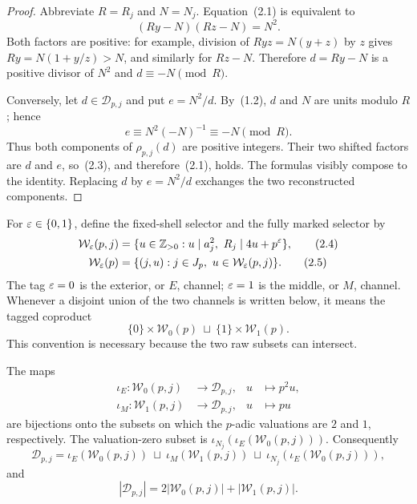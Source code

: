 \begin{proof}
Abbreviate \(R=R_j\) and \(N=N_j\).  Equation~(2.1) is equivalent to
\begin{equation}
 (Ry-N)(Rz-N)=N^2.                                            \tag{2.3}
\end{equation}
Both factors are positive: for example, division of
\(Ryz=N(y+z)\) by \(z\) gives \(Ry=N(1+y/z)>N\), and similarly for
\(Rz-N\).  Therefore \(d=Ry-N\) is a positive divisor of \(N^2\) and
\(d\equiv-N\pmod R\).

Conversely, let \(d\in\mathscr D_{p,j}\) and put \(e=N^2/d\).  By~(1.2),
\(d\) and \(N\) are units modulo \(R\); hence
\[
 e\equiv N^2(-N)^{-1}\equiv-N\pmod R.
\]
Thus both components of \(\rho_{p,j}(d)\) are positive integers.  Their
 two shifted factors are \(d\) and \(e\), so~(2.3), and therefore~(2.1),
 holds.  The formulas visibly compose to the identity.  Replacing \(d\) by
\(e=N^2/d\) exchanges the two reconstructed components.
\end{proof}

For \(\varepsilon\in\{0,1\}\), define the fixed-shell selector and the fully marked
selector by
\begin{align}
 \mathcal W_\eps(p,j)
 &=\{u\in\ZZpos:u\mid a_j^2,\ R_j\mid4u+p^\eps\},             \tag{2.4}\\
 \mathcal W_\eps(p)
 &=\{(j,u):j\in J_p,\ u\in\mathcal W_\eps(p,j)\}.           \tag{2.5}
\end{align}
The tag \(\varepsilon=0\) is the exterior, or \(E\), channel; \(\varepsilon=1\) is the
middle, or \(M\), channel.
Whenever a disjoint union of the two channels is written below, it means the
tagged coproduct
\[
 \{0\}\times\mathcal W_0(p)\ \sqcup\
 \{1\}\times\mathcal W_1(p).
\]
This convention is necessary because the two raw subsets can intersect.

\begin{proposition}\label{prop:esksb-two-channel}
The maps
\begin{align*}
 \iota_E:\mathcal W_0(p,j)&\longrightarrow\mathscr D_{p,j},
 &u&\longmapsto p^2u,\\
 \iota_M:\mathcal W_1(p,j)&\longrightarrow\mathscr D_{p,j},
 &u&\longmapsto pu
\end{align*}
are bijections onto the subsets on which the \(p\)-adic valuations are \(2\)
and \(1\), respectively.  The valuation-zero subset is
\(\iota_{N_j}(\iota_E(\mathcal W_0(p,j)))\).  Consequently
\begin{equation}
 \mathscr D_{p,j}=
 \iota_E(\mathcal W_0(p,j))\ \sqcup\
 \iota_M(\mathcal W_1(p,j))\ \sqcup\
 \iota_{N_j}(\iota_E(\mathcal W_0(p,j))),                    \tag{2.6}
\end{equation}
and
\begin{equation}
 |\mathscr D_{p,j}|=2|\mathcal W_0(p,j)|+|\mathcal W_1(p,j)|. \tag{2.7}
\end{equation}
\end{proposition}

